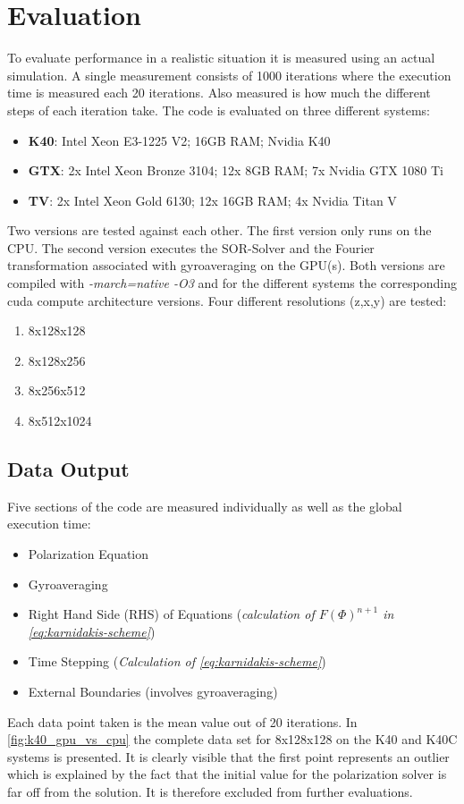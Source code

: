 \documentclass[master.tex]{subfiles}
\begin{document}
\section{Evaluation}
To evaluate performance in a realistic situation it is measured using an actual simulation. A single measurement consists of 1000 iterations where the execution time is measured each 20 iterations. Also measured is how much the different steps of each iteration take.\newline
The code is evaluated on three different systems:
\begin{itemize}
    \item \textbf{\ac{K40}}: Intel Xeon E3-1225 V2; 16GB RAM; Nvidia K40
    \item \textbf{\ac{GTX}}: 2x Intel Xeon Bronze 3104; 12x 8GB RAM; 7x Nvidia GTX 1080 Ti
    \item \textbf{\ac{TV}}: 2x Intel Xeon Gold 6130; 12x 16GB RAM; 4x Nvidia Titan V
\end{itemize}
Two versions are tested against each other. The first version only runs on the CPU. The second version executes the \ac{SOR}-Solver and the Fourier transformation associated with gyroaveraging on the GPU(s). Both versions are compiled with \textit{-march=native -O3} and for the different systems the corresponding cuda compute architecture versions. Four different resolutions (z,x,y) are tested:
\begin{enumerate}
    \item 8x128x128
    \item 8x128x256
    \item 8x256x512
    \item 8x512x1024
\end{enumerate}

\subsection{Data Output}
Five sections of the code are measured individually as well as the global execution time:
\begin{itemize}
    \item Polarization Equation
    \item Gyroaveraging
    \item Right Hand Side (RHS) of Equations (\textit{calculation of $F(\Phi)^{n+1}$ in \autoref{eq:karnidakis-scheme}})
    \item Time Stepping (\textit{Calculation of \autoref{eq:karnidakis-scheme}})
    \item External Boundaries (involves gyroaveraging)
\end{itemize}
Each data point taken is the mean value out of 20 iterations. In \autoref{fig:k40_gpu_vs_cpu} the complete data set for 8x128x128 on the \ac{K40} and \ac{K40C} systems is presented. It is clearly visible that the first point represents an outlier which is explained by the fact that the initial value for the polarization solver is far off from the solution. It is therefore excluded from further evaluations. 
\end{document}
